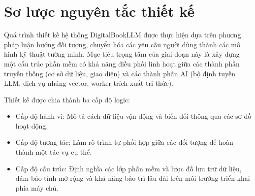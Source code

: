 \section{Sơ lược nguyên tắc thiết kế}
Quá trình thiết kế hệ thống DigitalBookLLM được thực hiện dựa trên phương pháp luận hướng đối tượng, chuyển hóa các yêu cầu người dùng thành các mô hình kỹ thuật tường minh. Mục tiêu trọng tâm của giai đoạn này là xây dựng một cấu trúc phần mềm có khả năng điều phối linh hoạt giữa các thành phần truyền thống (cơ sở dữ liệu, giao diện) và các thành phần AI (bộ định tuyến LLM, dịch vụ nhúng vector, worker trích xuất tri thức).

Thiết kế được chia thành ba cấp độ logic:
\begin{itemize}
    \item Cấp độ hành vi: Mô tả cách dữ liệu vận động và biến đổi thông qua các sơ đồ hoạt động.
    \item Cấp độ tương tác: Làm rõ trình tự phối hợp giữa các đối tượng để hoàn thành một tác vụ cụ thể.
    \item Cấp độ cấu trúc: Định nghĩa các lớp phần mềm và lược đồ lưu trữ dữ liệu, đảm bảo tính mở rộng và khả năng bảo trì lâu dài trên môi trường triển khai phía máy chủ.
\end{itemize}

